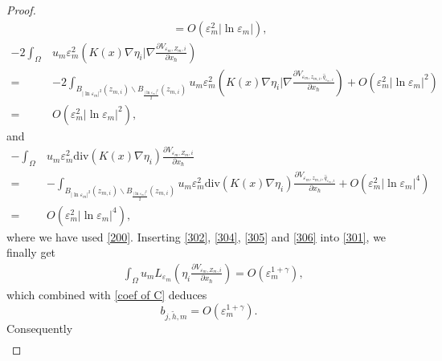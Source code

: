 \documentclass[10pt,a4paper]{amsart}
\begin{document}
\begin{proof}
\begin{equation}
\begin{array}{ll}
\qquad=O\left( \varepsilon_m^2|\ln\varepsilon_m|\right),
\end{array}
\end{equation}
\begin{equation}\label{305}
\begin{split}
-2\int_{\Omega}&u_m\varepsilon_m^2\left (K(x)\nabla\eta_i|\nabla   \frac{\partial V_{\varepsilon_m, Z_{m},i}}{\partial x_\hbar}  \right )\\
=&-2\int_{B_{|\ln\varepsilon_m|^{2}}(z_{m,i})\backslash B_{\frac{|\ln\varepsilon_m|^{2}}{2}}(z_{m,i})}u_m\varepsilon_m^2\left (K(x)\nabla\eta_i|\nabla   \frac{\partial V_{\varepsilon_m, z_{m,i},\hat{q}_{\varepsilon_m,i}}}{\partial x_\hbar}  \right )+O\left( \varepsilon_m^2|\ln\varepsilon_m|^{2}\right)\\
=&O\left( \varepsilon_m^2|\ln\varepsilon_m|^{2}\right),
\end{split}
\end{equation}
and
\begin{equation}\label{306}
\begin{split}
-\int_{\Omega}&u_m\varepsilon_m^2\text{div}\left (K(x)\nabla   \eta_i  \right )\frac{\partial V_{\varepsilon_m, Z_{m},i}}{\partial x_\hbar}\\
=&-\int_{B_{|\ln\varepsilon_m|^{2}}(z_{m,i})\backslash B_{\frac{|\ln\varepsilon_m|^{2}}{2}}(z_{m,i})}u_m\varepsilon_m^2\text{div}\left (K(x)\nabla   \eta_i  \right )\frac{\partial V_{\varepsilon_m, z_{m,i},\hat{q}_{\varepsilon_m,i}}}{\partial x_\hbar}+O\left( \varepsilon_m^2|\ln\varepsilon_m|^{4}\right)\\
=&O\left( \varepsilon_m^2|\ln\varepsilon_m|^{4}\right),
\end{split}
\end{equation}
where we have used \eqref{200}. Inserting \eqref{302}, \eqref{304}, \eqref{305} and \eqref{306} into \eqref{301}, we finally get
\begin{equation*}
\begin{split}
&\int_{\Omega}u_mL_{\varepsilon_m}\left( \eta_i\frac{\partial V_{\varepsilon_m, Z_{m},i}}{\partial x_\hbar}\right) =O\left( \varepsilon_m^{1+\gamma}\right),
\end{split}
\end{equation*}
which combined with \eqref{coef of C} deduces
\begin{equation*}
b_{j,\tilde{h},m}=O\left (\varepsilon_m^{1+\gamma}\right ).
\end{equation*}
Consequently
\begin{equation*}
\begin{split}

\end{split}
\end{equation*}
\end{proof}
\end{document}
